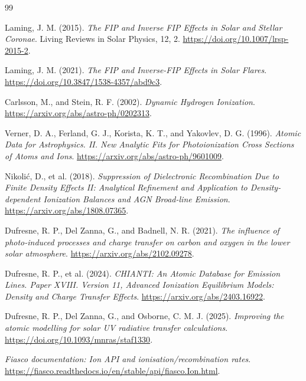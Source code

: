 \documentclass[a4paper,10pt,twoside,openany]{book}
\newcommand{\ChapColor}{Cap1Blue}
\newcommand{\ChapColorLight}{LightBlue}
\newcommand{\setChapColor}[2]{%
  \renewcommand{\ChapColor}{#1}%
  \renewcommand{\ChapColorLight}{#2}}
\numberwithin{equation}{chapter}
\begin{document}
\backmatter
\setChapColor{Cap1Blue}{LightBlue}
\begin{thebibliography}{99}
Laming, J. M. (2015).
\textit{The FIP and Inverse FIP Effects in Solar and Stellar Coronae}.
Living Reviews in Solar Physics, 12, 2.
\url{https://doi.org/10.1007/lrsp-2015-2}.

Laming, J. M. (2021).
\textit{The FIP and Inverse-FIP Effects in Solar Flares}.
\url{https://doi.org/10.3847/1538-4357/abd9c3}.

Carlsson, M., and Stein, R. F. (2002).
\textit{Dynamic Hydrogen Ionization}.
\url{https://arxiv.org/abs/astro-ph/0202313}.

Verner, D. A., Ferland, G. J., Korista, K. T., and Yakovlev, D. G.
(1996).
\textit{Atomic Data for Astrophysics. II. New Analytic Fits for
Photoionization Cross Sections of Atoms and Ions}.
\url{https://arxiv.org/abs/astro-ph/9601009}.

Nikoli\'c, D., et al. (2018).
\textit{Suppression of Dielectronic Recombination Due to Finite
Density Effects II: Analytical Refinement and Application to
Density-dependent Ionization Balances and AGN Broad-line Emission}.
\url{https://arxiv.org/abs/1808.07365}.

Dufresne, R. P., Del Zanna, G., and Badnell, N. R. (2021).
\textit{The influence of photo-induced processes and charge transfer
on carbon and oxygen in the lower solar atmosphere}.
\url{https://arxiv.org/abs/2102.09278}.

Dufresne, R. P., et al. (2024).
\textit{CHIANTI: An Atomic Database for Emission Lines.
Paper XVIII. Version 11, Advanced Ionization Equilibrium Models:
Density and Charge Transfer Effects}.
\url{https://arxiv.org/abs/2403.16922}.

Dufresne, R. P., Del Zanna, G., and Osborne, C. M. J. (2025).
\textit{Improving the atomic modelling for solar UV radiative
transfer calculations}.
\url{https://doi.org/10.1093/mnras/staf1330}.

\textit{Fiasco documentation: Ion API and ionisation/recombination rates}.
\url{https://fiasco.readthedocs.io/en/stable/api/fiasco.Ion.html}.
\end{thebibliography}
\end{document}
